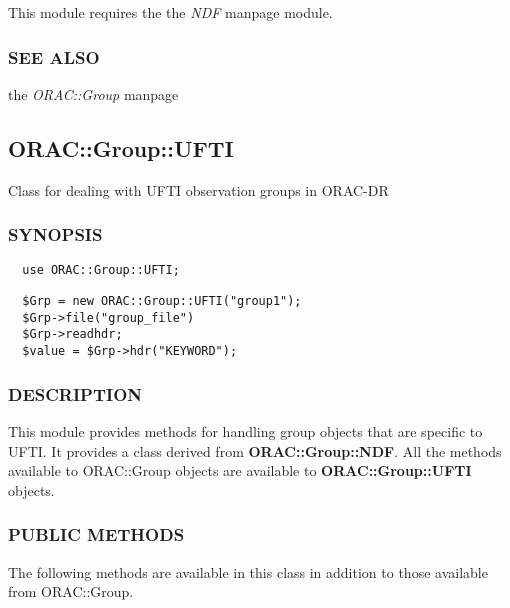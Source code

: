 This module requires the the \emph{NDF} manpage module.

\subsubsection*{SEE ALSO\label{ORAC::Group::NDF_SEE_ALSO}}

the \emph{ORAC::Group} manpage



\subsection{ORAC::Group::UFTI\label{ORAC::Group::UFTI}}

Class for dealing with UFTI observation groups in ORAC-DR

\subsubsection*{SYNOPSIS\label{ORAC::Group::UFTI_SYNOPSIS}}\begin{verbatim}
  use ORAC::Group::UFTI;
\end{verbatim}
\begin{verbatim}
  $Grp = new ORAC::Group::UFTI("group1");
  $Grp->file("group_file")
  $Grp->readhdr;
  $value = $Grp->hdr("KEYWORD");
\end{verbatim}
\subsubsection*{DESCRIPTION\label{ORAC::Group::UFTI_DESCRIPTION}}

This module provides methods for handling group objects that
are specific to UFTI. It provides a class derived from \textbf{ORAC::Group::NDF}.
All the methods available to ORAC::Group objects are available
to \textbf{ORAC::Group::UFTI} objects.

\subsubsection*{PUBLIC METHODS\label{ORAC::Group::UFTI_PUBLIC_METHODS}}

The following methods are available in this class in addition to
those available from ORAC::Group.

